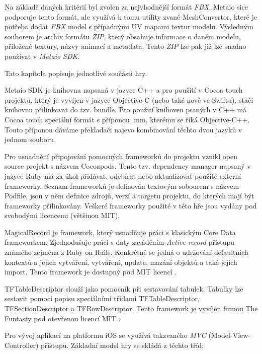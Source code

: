 \documentclass[twoside,12pt]{article}
\begin{document}
Na základě daných kritérií byl zvolen za nejvhodnější formát \textit{FBX}. Metaio sice podporuje tento formát, ale využívá k tomu utility zvané MeshConvertor, které je potřeba dodat \textit{FBX} model s případnými UV mapami textur modelu. Výsledným souborem je archiv formátu \textit{ZIP}, který obsahuje informace o daném modelu, přiložené textury, názvy animací a metadata. Tento \textit{ZIP} lze pak již lze snadno používat v \textit{Metaio SDK}.


% 
\newpage


Tato kapitola popisuje jednotlivé součásti hry.  

Metaio SDK je knihovna napsaná v jazyce C++ a pro použití v Cocoa touch projektu, který je vyvíjen v jazyce Objective-C (nebo také nově ve Swiftu), stačí knihovnu přilinkovat do tzv. bundle. Pro použití knihoven psaných v C++ má Cocoa touch speciální formát s příponou .mm, kterému se říká Objective-C++. Touto příponou dáváme překladači najevo kombinování těchto dvou jazyků v jednom souboru. 

Pro usnadnění připojování pomocných frameworků do projektu vznikl open source projekt s názvem Cocoapods. Tento tzv. dependency manager napsaný v jazyce Ruby má za úkol přidávat, odebírat nebo aktualizovat použité externí frameworky. Seznam frameworků je definován textovým sobourem s názvem Podfile, jsou v něm definice zdrojů, verzí a targetu projektu, do kterých mají být frameworky přilinkovány. Veškeré frameworky použité v této hře jsou vydány pod svobodými licencemi (většinou MIT).

MagicalRecord je framework, který usnadňuje práci s klasickým Core Data frameworkem. Zjednodušuje práci s daty zaváděním \textit{Active record} přístupu známého zejména z Ruby on Rails. Konkrétně se jedná o udržování defaultních kontextů a jejich vytváření, vytváření, update, mazání objektů a také jejich import. Tento framework je dostupný pod MIT licencí \cite{magical_record}.

TFTableDescriptor slouží jako pomocník při sestavování tabulek. Tabulky lze sestavit pomocí popisu  speciálními třídami TFTableDescriptor, TFSectionDescriptor a TFRowDescriptor. Tento framework je vyvíjen firmou The Funtasty pod otevřenou licencí MIT \cite{tftabledescriptor}.


Pro vývoj aplikací na platformu iOS se využívá takzvaného \textit{MVC} (Model-View-Controller) přístupu. Základní model hry se skládá z těchto tříd:
\end{document}
